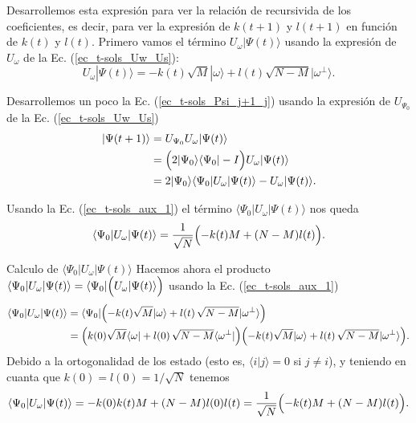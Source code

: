 \documentclass[a4paper,11pt]{article} %
\numberwithin{equation}{section}
\def\Lp{\Bigl(}
\def\Rp{\Bigr)}
\begin{document}
Desarrollemos esta expresión para ver la relación de recursivida de los coeficientes, es decir, para ver la expresión de $k(t+1)$ y $l(t+1)$ en función de $k(t)$ y $l(t)$. Primero vamos el término $U_\omega |\Psi(t) \rangle$ usando la expresión de $U_\omega$ de la Ec. (\ref{ec_t-sols_Uw_Us}):
\begin{equation} \label{ec_t-sols_aux_1}
U_\omega |\Psi(t) \rangle =  - k(t)  \sqrt{M}|\omega \rangle + l(t) \sqrt{N-M} | \omega^{\perp} \rangle.
\end{equation}

Desarrollemos un poco la Ec. (\ref{ec_t-sols_Psi_j+1_j}) usando la expresión de $U_{\Psi_0}$ de la  Ec. (\ref{ec_t-sols_Uw_Us})
\begin{equation} \label{ec_t-sols_aux_2}
\begin{split}
|\Psi(t+1) \rangle & =  U_{\Psi_0} U_\omega |\Psi(t) \rangle  \\
& =  \Bigl( 2 |\Psi_0 \rangle \langle \Psi_0 | - I \Bigr) U_\omega |\Psi(t) \rangle  \\ 
& =  2 |\Psi_0 \rangle \langle \Psi_0 |  U_\omega |\Psi(t) \rangle  - U_\omega |\Psi(t) \rangle .
\end{split}
\end{equation}

Usando la Ec. (\ref{ec_t-sols_aux_1}) el término $\langle \Psi_0 |  U_\omega |\Psi(t) \rangle$ nos queda
\begin{equation} \label{ec_t-sols_aux_3}
\langle \Psi_0 | U_\omega |\Psi(t) \rangle = \frac{1}{\sqrt{N}} \Lp -k(t) M + (N-M) l(t) \Rp.
\end{equation}

	\begin{mybox_green}{Calculo de $\langle \Psi_0 |  U_\omega |\Psi(t) \rangle$}
	Hacemos ahora el producto $ \langle \Psi_0 |  U_\omega |\Psi(t) \rangle  =  \langle \Psi_0 | \Lp U_\omega |\Psi(t) \rangle \Rp $ 
	usando la Ec. (\ref{ec_t-sols_aux_1})
	\begin{equation*}
	\begin{split}
	\langle \Psi_0 | U_\omega |\Psi(t) \rangle 
	& = \langle \Psi_0 | \Lp -k(t) \sqrt{M} |\omega \rangle + l(t) \, \sqrt{N-M} | \omega^{\perp} \rangle \Rp \\
	& = \Lp k(0) \sqrt{M} \langle \omega| + l(0) \, \sqrt{N-M} \langle \omega^{\perp} | \Rp
	\Lp -k(t) \sqrt{M} |\omega \rangle + l(t) \, \sqrt{N-M} | \omega^{\perp} \rangle \Rp .
	\end{split}
	\end{equation*}
	Debido a la ortogonalidad de los estado (esto es, $\langle i | j \rangle =0$ si $j\neq i$), y teniendo en cuanta que $k(0) = l(0) = 1/\sqrt{N}$ tenemos
	\begin{equation*} 
	\langle \Psi_0 | U_\omega |\Psi(t) \rangle = - k(0) k(t) M + (N-M) l(0) l(t) = 
	\frac{1}{\sqrt{N}} \Lp -k(t) M + (N-M) l(t) \Rp.
	\end{equation*}
	\end{mybox_green}	
\end{document}
